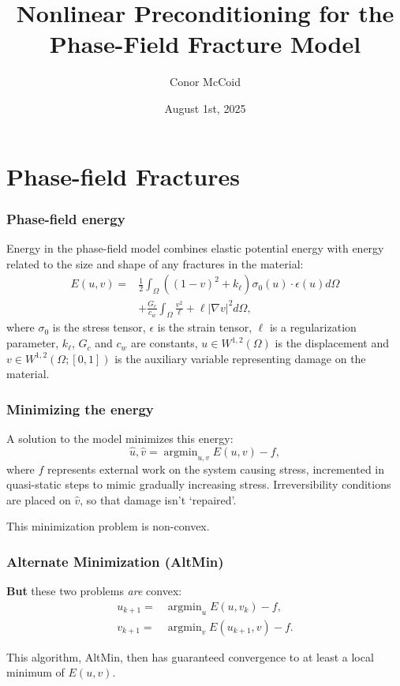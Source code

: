 \documentclass{beamer}
\title{Nonlinear Preconditioning for the Phase-Field Fracture Model}
\author{Conor McCoid}
\institute{McMaster University}
\date{August 1st, 2025}
\DeclareMathOperator*{\argmin}{argmin}
\begin{document}
\maketitle

\section{Phase-field Fractures}

\begin{frame}
\frametitle{Phase-field energy}

Energy in the phase-field model combines elastic potential energy with energy related to the size and shape of any fractures in the material:
\begin{align*}
E(u,v) = & \frac{1}{2} \int_\Omega \left ( (1-v)^2 + k_\ell \right ) \sigma_0(u) \cdot \epsilon(u) d\Omega \\
		& + \frac{G_c}{c_w} \int_\Omega \frac{v^2}{\ell} + \ell \lvert \nabla v \rvert^2 d\Omega,
\end{align*}
where $\sigma_0$ is the stress tensor, $\epsilon$ is the strain tensor, $\ell$ is a regularization parameter, $k_\ell$, $G_c$ and $c_w$ are constants, $u \in W^{1,2}(\Omega)$ is the displacement and $v \in W^{1,2}(\Omega; [0,1])$ is the auxiliary variable representing damage on the material.

\end{frame}

\begin{frame}
\frametitle{Minimizing the energy}

A solution to the model minimizes this energy:
\begin{equation*}
\hat{u}, \hat{v} = \argmin_{u,v} E(u,v) - f,
\end{equation*}
where $f$ represents external work on the system causing stress, incremented in quasi-static steps to mimic gradually increasing stress.
Irreversibility conditions are placed on $\hat{v}$, so that damage isn't `repaired'.

This minimization problem is non-convex.

\end{frame}

\begin{frame}
\frametitle{Alternate Minimization (AltMin)}

\textbf{But} these two problems \textit{are} convex:
\begin{align*}
	u_{k+1} = & \argmin_u E(u, v_k) - f, \\ v_{k+1} = & \argmin_v E(u_{k+1}, v) - f.
\end{align*}

This algorithm, AltMin, then has guaranteed convergence to at least a local minimum of $E(u,v)$.

\end{frame}
\end{document}
